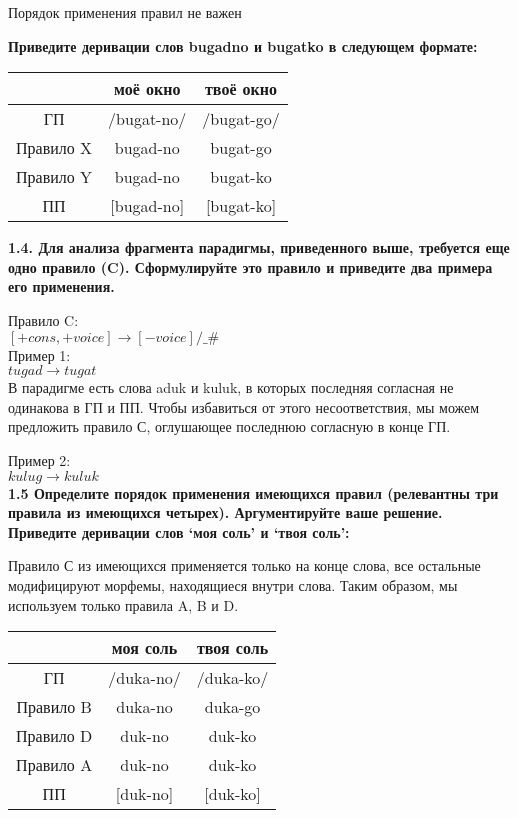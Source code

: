 \documentclass[a4paper,12pt]{article}
\begin{document}
Порядок применения правил не важен

\textbf{Приведите деривации слов bugadno и bugatko в следующем формате:}

\begin{center}
\begin{tabular}{|c c c|} 
 \hline
  & моё окно & твоё окно \\ [0.5ex] 
 \hline
 ГП & /bugat-no/ & /bugat-go/ \\ 
 \hline
 Правило X & bugad-no & bugat-go \\
 \hline
 Правило Y & bugad-no & bugat-ko \\
 \hline
 ПП & [bugad-no] & [bugat-ko] \\
 \hline
\end{tabular}
\end{center}

\textbf{1.4. Для анализа фрагмента парадигмы, приведенного выше, требуется еще одно
правило (C). Сформулируйте это правило и приведите два примера его применения.}

Правило C: \\
$[+cons, +voice] \rightarrow [-voice]/ \_ \# $ \\

Пример 1:\\
$tugad \rightarrow tugat$ \\
В парадигме есть слова aduk и kuluk, в которых последняя согласная не одинакова в ГП и ПП. Чтобы избавиться от этого несоответствия, мы можем предложить правило С, оглушающее последнюю согласную в конце ГП.

Пример 2:\\
$kulug \rightarrow kuluk$ \\

\textbf{1.5 Определите порядок применения имеющихся правил (релевантны три правила из имеющихся четырех). Аргументируйте ваше решение. Приведите деривации слов
‘моя соль’ и ‘твоя соль’:}

Правило С из имеющихся применяется только на конце слова, все остальные модифицируют морфемы, находящиеся внутри слова. Таким образом, мы используем только правила A, B и D.

\begin{center}
\begin{tabular}{|c c c|} 
 \hline
  & моя соль & твоя соль \\ [0.5ex] 
 \hline
 ГП & /duka-no/ & /duka-ko/ \\ 
 \hline
 Правило B & duka-no & duka-go \\
 \hline
 Правило D & duk-no & duk-ko \\
 \hline
 Правило A & duk-no & duk-ko \\
 \hline
 ПП & [duk-no] & [duk-ko] \\
 \hline
\end{tabular}
\end{center}
\end{document}
